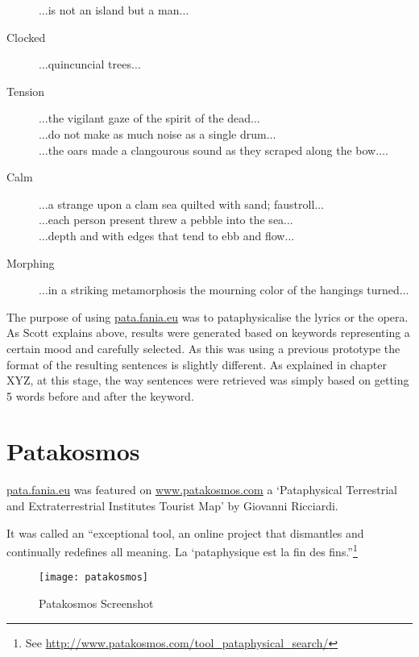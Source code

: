 \begin{description}
                $\ldots$is not an island but a man$\ldots$
  \item [Clocked] $\ldots$quincuncial trees$\ldots$
  \item [Tension] $\ldots$the vigilant gaze of the spirit of the dead$\ldots$\\
                    $\ldots$do not make as much noise as a single drum$\ldots$\\
                    $\ldots$the oars made a clangourous sound as they scraped along the bow$\ldots$.
  \item [Calm] $\ldots$a strange upon a clam sea quilted with sand; faustroll$\ldots$\\
                  $\ldots$each person present threw a pebble into the sea$\ldots$\\
                  $\ldots$depth and with edges that tend to ebb and flow$\ldots$
  \item [Morphing] $\ldots$in a striking metamorphosis the mourning color of the hangings turned$\ldots$
\end{description}

\spirals

The purpose of using \url{pata.fania.eu} was to pataphysicalise the lyrics or the opera. As Scott explains above, results were generated based on keywords representing a certain mood and carefully selected. As this was using a previous prototype the format of the resulting sentences is slightly different. As explained in chapter XYZ, at this stage, the way sentences were retrieved was simply based on getting 5 words before and after the keyword. 




\section{Patakosmos}

\url{pata.fania.eu} was featured on \url{www.patakosmos.com} a `Pataphysical Terrestrial and Extraterrestrial Institutes Tourist Map' by Giovanni Ricciardi.

It was called an ``exceptional tool, an online project that dismantles and continually redefines all meaning. La ‘pataphysique est la fin des fins.''\footnote{See \url{http://www.patakosmos.com/tool_pataphysical_search/}}

\begin{figure}[!htbp]
  \centering
  \texttt{[image: patakosmos]}
\caption[Patakosmos Screenshot]{Patakosmos Screenshot}
\label{fig:patakosmos}
\end{figure}



